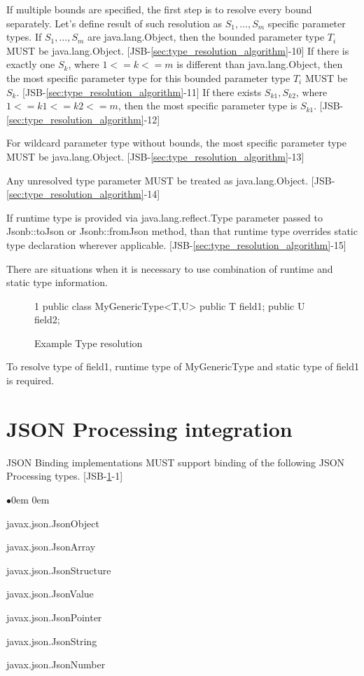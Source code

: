 If multiple bounds are specified, the first step is to resolve every bound separately. Let's define result of such resolution as \(S_1,\dotsc,S_m\) specific parameter types. If \(S_1,\dotsc,S_m\) are java.lang.Object, then the bounded parameter type \(T_i\) MUST be java.lang.Object. [JSB-\ref{sec:type_resolution_algorithm}-10] 
If there is exactly one \(S_k\), where \(1<=k<=m\) is different than java.lang.Object, then the most specific parameter type for this bounded parameter type \(T_i\) MUST be \(S_k\). [JSB-\ref{sec:type_resolution_algorithm}-11] If there exists \(S_{k1},S_{k2}\), where \(1<=k1<=k2<=m\), then the most specific parameter type is \(S_{k1}\). [JSB-\ref{sec:type_resolution_algorithm}-12]

For wildcard parameter type without bounds, the most specific parameter type MUST be java.lang.Object. [JSB-\ref{sec:type_resolution_algorithm}-13]

Any unresolved type parameter MUST be treated as java.lang.Object. [JSB-\ref{sec:type_resolution_algorithm}-14]

If runtime type is provided via java.lang.reflect.Type parameter passed to Jsonb::toJson or Jsonb::fromJson method, than that runtime type overrides static type declaration wherever applicable. [JSB-\ref{sec:type_resolution_algorithm}-15]

There are situations when it is necessary to use combination of runtime and static type information. 
\begin{figure}[hbtp]
\caption{Example Type resolution}
\label{ex2}
\begin{listing}{1}
public class MyGenericType<T,U> {
    public T field1;
    public U field2;
}\end{listing}
\end{figure}

To resolve type of field1, runtime type of MyGenericType and static type of field1 is required.

\section{JSON Processing integration}
\label{sec:jsonp_integration}
JSON Binding implementations MUST support binding of the following JSON Processing types. [JSB-\ref{sec:jsonp_integration}-1]

\begin{list}{$\bullet$}{\parsep 0em  0em}
\item javax.json.JsonObject
\item javax.json.JsonArray
\item javax.json.JsonStructure
\item javax.json.JsonValue
\item javax.json.JsonPointer
\item javax.json.JsonString
\item javax.json.JsonNumber
\end{list}

